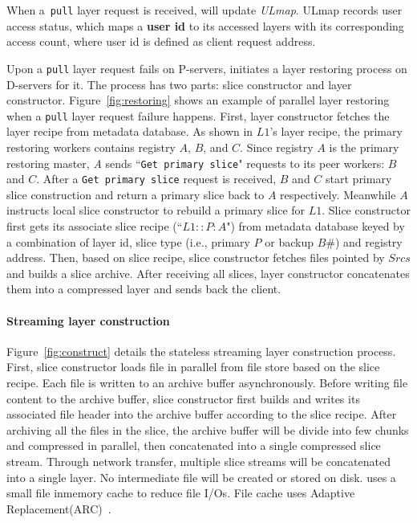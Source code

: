 When a~\texttt{pull} layer request is received, 
\sysname will update \emph{ULmap}. 
ULmap records user access status,
which maps a \textbf{user id} to its accessed layers with its corresponding access count,
where user id is defined as client request address.

Upon a \texttt{pull} layer request fails on P-servers,
\sysname initiates a layer restoring process on D-servers for it.
The process has two parts: slice constructor and layer constructor.
Figure~\ref{fig:restoring} shows an example of parallel layer restoring when a \texttt{pull} layer request failure happens.
First, 
layer constructor fetches the layer recipe from metadata database.
As shown in $L1$'s layer recipe, 
the primary restoring workers contains registry $A$, $B$, and $C$.
Since registry $A$ is the primary restoring master,
\emph{A} sends ``\texttt{Get primary slice}" requests to its peer workers: $B$ and $C$.
After a \texttt{Get primary slice} request is received, 
$B$ and $C$ start primary slice construction and return a primary slice back to $A$ respectively.
Meanwhile $A$ instructs local slice constructor to rebuild a primary slice for $L1$.
Slice constructor first gets its associate slice recipe (``$L1::P:A$") from metadata database 
keyed by a combination of  layer id, slice type (i.e., primary $P$ or backup $B \#$) and registry address.
Then, based on slice recipe,
slice constructor fetches files pointed by $Srcs$
and builds a slice archive.
After receiving all slices, layer constructor concatenates them into a compressed layer
and sends back the client. 

\paragraph{Streaming layer construction}
Figure~\ref{fig:construct} details the stateless streaming layer construction process.
First, slice constructor loads file in parallel from file store based on the slice recipe.
Each file is written to an archive buffer asynchronously.
Before writing file content to the archive buffer, slice constructor first builds and writes its
associated 
file header into the archive buffer according to the slice recipe. 
After archiving all the files in the slice,
the archive buffer will be divide into few chunks and compressed in parallel,
then concatenated into a single compressed slice stream.
Through network transfer, multiple slice streams will be concatenated into a single layer.
No intermediate file will be created or stored on disk.
\sysname uses a small file inmemory cache to reduce file I/Os. 
File cache uses Adaptive Replacement(ARC)~\cite{xxx}.

